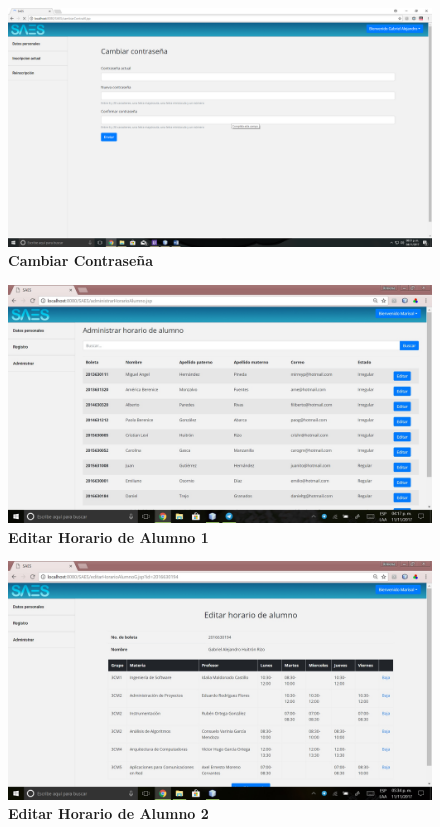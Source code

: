 \begin{figure}[H]
  \centering
    \includegraphics[scale=0.2]{project/images/9.png}
  \caption{\textbf{Cambiar Contraseña}}
\end{figure}
\begin{figure}[H]
  \centering
    \includegraphics[scale=0.3]{project/images/editar_horario_alumno_01.jpg}
  \caption{\textbf{Editar Horario de Alumno 1}}
\end{figure}
\begin{figure}[H]
  \centering
    \includegraphics[scale=0.3]{project/images/editar_horario_alumno_02.jpg}
  \caption{\textbf{Editar Horario de Alumno 2}}
\end{figure}
